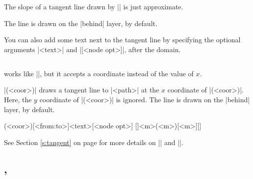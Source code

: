 \remark
The slope of a tangent line drawn by |\tztangentat| is just approximate.

The line is drawn on the |behind| layer, by default.

You can also add some text next to the tangent line by specifying the optional arguments |{<text>}| and |[<node opt>]|, after the domain.

\begin{tzcode}{.3}
\end{tzcode}

\subsection{\protect\cmd{\tztangent}}
\label{ssi:tztangent}

\icmd{\tztangent} works like |\tztangentat|, but it accepts a coordinate instead of the value of $x$.

|(<coor>)| draws a tangent line to |<path>| at the $x$ coordinate of |(<coor>)|. Here, the $y$ coordinate of |(<coor>)| is ignored. The line is drawn on the |behind| layer, by default.


\begin{tzdef}
(<coor>)[<from:to>]{<text>}[<node opt>]
  []{<m>}(<m>)[<m>]{}[]
\end{tzdef}

\begin{tzcode}{.3}
\end{tzcode}


See Section \ref{s:tangent} on page \pageref{s:tangent} for more details on |\tztangent| and |\tztangentat|.


\subsection{\protect\cmd{\tzsecantat}, \protect\cmd{\tzsecant}}
\label{ssi:tzsecant}

